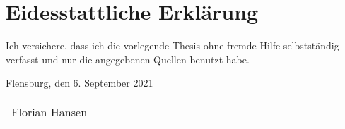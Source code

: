 \chapter*{Eidesstattliche Erklärung}
{Ich versichere, dass ich die vorlegende Thesis ohne fremde Hilfe selbstständig verfasst und nur die angegebenen Quellen benutzt habe.\par}
\vspace{1.5cm}
{Flensburg, den 6. September 2021\par}
\vspace{1cm}
\begin{tabularx}{\linewidth}{p{6cm}X}\cline{1-1}
	Florian Hansen &
\end{tabularx}